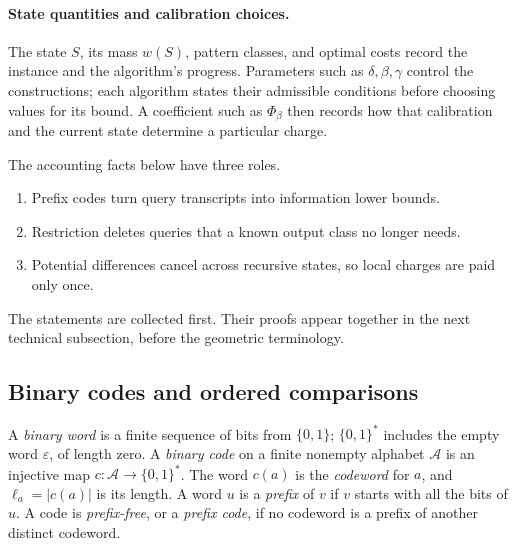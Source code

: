 




\paragraph{State quantities and calibration choices.}
The state $S$, its mass $w(S)$, pattern classes, and optimal costs
record the instance and the algorithm's progress. Parameters such as
$\delta,\beta,\gamma$ control the constructions; each algorithm states
their admissible conditions before choosing values for its bound. A
coefficient such as $\Phi_\beta$ then records how that calibration and
the current state determine a particular charge.

\begin{proofstrategy}
The accounting facts below have three roles.
\begin{enumerate}
\item Prefix codes turn query transcripts into information lower bounds.
\item Restriction deletes queries that a known output class no longer needs.
\item Potential differences cancel across recursive states, so local
      charges are paid only once.
\end{enumerate}
The statements are collected first. Their proofs appear together in
the next technical subsection, before the geometric terminology.
\end{proofstrategy}

\subsection{Binary codes and ordered comparisons}


\begin{definition}\label{def:binary-code}
A \emph{binary word} is a finite sequence of bits from $\{0,1\}$;
$\{0,1\}^*$ includes the empty word $\varepsilon$, of length zero.
A \emph{binary code} on a finite nonempty alphabet $\mathcal A$ is
an injective map $c:\mathcal A\to\{0,1\}^*$. The word $c(a)$ is
the \emph{codeword} for $a$, and $\ell_a=|c(a)|$ is its length.
A word $u$ is a \emph{prefix} of $v$ if $v$ starts with all the
bits of $u$. A code is \emph{prefix-free}, or a \emph{prefix code},
if no codeword is a prefix of another distinct codeword.
\end{definition}

